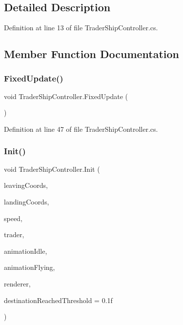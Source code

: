 \subsection{Detailed Description}


Definition at line 13 of file Trader\+Ship\+Controller.\+cs.



\subsection{Member Function Documentation}
\mbox{\label{class_trader_ship_controller_aac88c8ca28ad164eb1f2f1c940ec09db}} 
\subsubsection{\texorpdfstring{Fixed\+Update()}{FixedUpdate()}}
{\footnotesize\ttfamily void Trader\+Ship\+Controller.\+Fixed\+Update (\begin{DoxyParamCaption}{ }\end{DoxyParamCaption})}



Definition at line 47 of file Trader\+Ship\+Controller.\+cs.

\mbox{\label{class_trader_ship_controller_afa953294ab4d357391c64fcea6954f34}} 
\subsubsection{\texorpdfstring{Init()}{Init()}}
{\footnotesize\ttfamily void Trader\+Ship\+Controller.\+Init (\begin{DoxyParamCaption}\item[{Vector3}]{leaving\+Coords,  }\item[{Vector3}]{landing\+Coords,  }\item[{float}]{speed,  }\item[{\hyperlink{class_trader}{Trader}}]{trader,  }\item[{\hyperlink{class_animation_1_1_spritename_animation}{Spritename\+Animation}}]{animation\+Idle,  }\item[{\hyperlink{class_animation_1_1_spritename_animation}{Spritename\+Animation}}]{animation\+Flying,  }\item[{Sprite\+Renderer}]{renderer,  }\item[{float}]{destination\+Reached\+Threshold = {\ttfamily 0.1f} }\end{DoxyParamCaption})}



